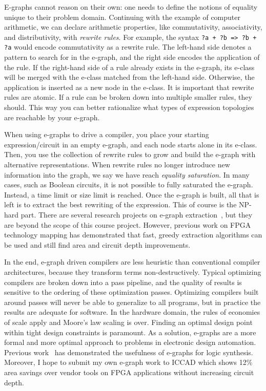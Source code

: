 \documentclass[10pt,letterpaper]{article}
\begin{document}
E-graphs cannot reason on their own: one needs to define the notions of
equality unique to their problem domain. Continuing with the example of
computer arithmetic, we can declare arithmetic properties, like commutativity,
associativity, and distributivity, with \textit{rewrite rules}. For example,
the syntax \texttt{?a + ?b => ?b + ?a} would encode commutativity as a rewrite
rule. The left-hand side denotes a pattern to search for in the e-graph, and
the right side encodes the application of the rule. If the right-hand side of a
rule already exists in the e-graph, its e-class will be merged with the e-class
matched from the left-hand side. Otherwise, the application is inserted as a
new node in the e-class. It is important that rewrite rules are atomic. If a
rule can be broken down into multiple smaller rules, they should. This way you
can better rationalize what types of expression topologies are reachable by
your e-graph.

When using e-graphs to drive a compiler, you place your starting
expression/circuit in an empty e-graph, and each node starts alone in its
e-class. Then, you use the collection of rewrite rules to grow and build the
e-graph with alternative representations. When rewrite rules no longer
introduce new information into the graph, we say we have reach \textit{equality
    saturation}. In many cases, such as Boolean circuits, it is not possible to
fully saturated the e-graph. Instead, a time limit or size limit is reached.
Once the e-graph is built, all that is left is to extract the best rewriting of
the expression. This of course is the NP-hard part. There are several research
projects on e-graph extraction~\cite{smoothe,sparsextract}, but they are beyond
the scope of this course project. However, previous work on FPGA technology
mapping has demonstrated that fast, greedy extraction algorithms can be used
and still find area and circuit depth improvements.

In the end, e-graph driven compilers are less heuristic than conventional
compiler architectures, because they transform terms non-destructively. Typical
optimizing compilers are broken down into a pass pipeline, and the quality of
results is sensitive to the ordering of these optimization passes. Optimizing
compilers built around passes will never be able to generalize to all programs,
but in practice the results are adequate for software. In the hardware domain,
the rules of economies of scale apply and Moore's law scaling is over. Finding
an optimal design point within tight design constraints is paramount. As a
solution, e-graphs are a more formal and more optimal approach to problems in
electronic design automation. Previous work~\cite{esyn} has demonstrated the
usefulness of e-graphs for logic synthesis. Moreover, I hope to submit my own
e-graph work to ICCAD which shows 12\% area savings over vendor tools on FPGA
applications without increasing circuit depth.
\end{document}
